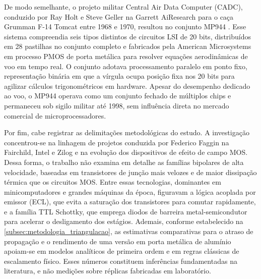 De modo semelhante, o projeto militar Central Air Data Computer (CADC), conduzido por Ray Holt e Steve Geller na Garrett AiResearch para o caça Grumman F-14 Tomcat entre 1968 e 1970, resultou no conjunto MP944 \cite{holt1998cadc}. Esse sistema compreendia seis tipos distintos de circuitos LSI de 20 bits, distribuídos em 28 pastilhas no conjunto completo e fabricados pela American Microsystems em processo PMOS de porta metálica para resolver equações aerodinâmicas de voo em tempo real. O conjunto adotava processamento paralelo em ponto fixo, representação binária em que a vírgula ocupa posição fixa nos 20 bits para agilizar cálculos trigonométricos em hardware. Apesar do desempenho dedicado ao voo, o MP944 operava como um conjunto fechado de múltiplos chips e permaneceu sob sigilo militar até 1998, sem influência direta no mercado comercial de microprocessadores.

Por fim, cabe registrar as delimitações metodológicas do estudo. A investigação concentrou-se na linhagem de projetos conduzida por Federico Faggin na Fairchild, Intel e Zilog e na evolução dos dispositivos de efeito de campo MOS. Dessa forma, o trabalho não examina em detalhe as famílias bipolares de alta velocidade, baseadas em transistores de junção mais velozes e de maior dissipação térmica que os circuitos MOS. Entre essas tecnologias, dominantes em minicomputadores e grandes máquinas da época, figuravam a lógica acoplada por emissor (ECL), que evita a saturação dos transistores para comutar rapidamente, e a família TTL Schottky, que emprega diodos de barreira metal-semicondutor para acelerar o desligamento dos estágios. Ademais, conforme estabelecido na \cref{subsec:metodologia_triangulacao}, as estimativas comparativas para o atraso de propagação e o rendimento de uma versão em porta metálica de alumínio apoiam-se em modelos analíticos de primeira ordem e em regras clássicas de escalamento físico. Esses números constituem inferências fundamentadas na literatura, e não medições sobre réplicas fabricadas em laboratório.